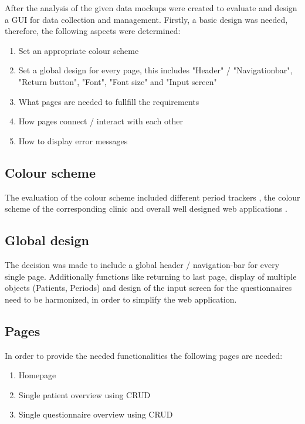 \documentclass[
a4paper,
11pt
]{article}
\begin{document}
	\noindent After the analysis of the given data mockups were created to evaluate and design a \ac{GUI} for data collection and management. Firstly, a basic design was needed, therefore, the following aspects were determined:
	
	\begin{enumerate}
		\item Set an appropriate colour scheme
		\item Set a global design for every page, this includes "Header" /  "Navigationbar", "Return button", "Font", "Font size" and "Input screen"
		\item What pages are needed to fullfill the requirements
		\item How pages connect / interact with each other
		\item How to display error messages
	\end{enumerate}
	
	\newpage
	\subsection*{Colour scheme}
	The evaluation of the colour scheme included different period trackers \cite{noauthor_trackle_nodate}, the colour scheme of the corresponding clinic and overall well designed web applications \cite{noauthor_uniklinik_nodate}.
	
	
	\subsection*{Global design}
	The decision was made to include a global header / navigation-bar for every single page. Additionally functions like returning to last page, display of multiple objects (Patients, Periods) and design of the input screen for the questionnaires need to be harmonized, in order to simplify the web application.
	
	\subsection*{Pages}
	In order to provide the needed functionalities the following pages are needed:
	\begin{enumerate}
		\item Homepage
		\item Single patient overview using \ac{CRUD}
		\item Single questionnaire overview using \ac{CRUD}
	\end{enumerate}
	
\end{document}

